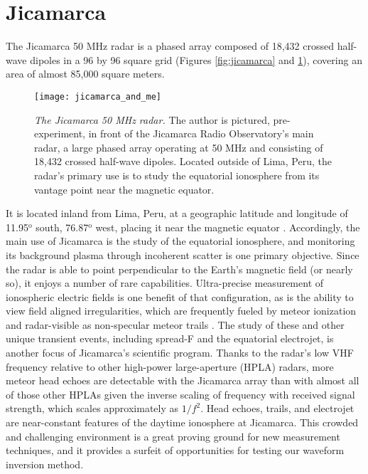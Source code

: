 \section{Jicamarca}
\label{jicamarca_overview}
The Jicamarca 50 MHz radar is a phased array composed of 18,432 crossed half-wave dipoles in a 96 by 96 square grid (Figures \ref{fig:jicamarca} and \ref{fig:jicamarca_and_me}), covering an area of almost 85,000 square meters.
\begin{figure}[tbp]
 \centering
 \texttt{[image: jicamarca\_and\_me]}
 \caption[The Jicamarca 50 MHz radar]{\emph{The Jicamarca 50 MHz radar.} The author is pictured, pre-experiment, in front of the Jicamarca Radio Observatory's main radar, a large phased array operating at 50 MHz and consisting of 18,432 crossed half-wave dipoles. Located outside of Lima, Peru, the radar's primary use is to study the equatorial ionosphere from its vantage point near the magnetic equator.}
 \label{fig:jicamarca_and_me}
\end{figure}%
It is located inland from Lima, Peru, at a geographic latitude and longitude of 11.95$^\text{o}$ south, 76.87$^\text{o}$ west, placing it near the magnetic equator \autocite{Och63}. Accordingly, the main use of Jicamarca is the study of the equatorial ionosphere, and monitoring its background plasma through incoherent scatter is one primary objective. Since the radar is able to point perpendicular to the Earth's magnetic field (or nearly so), it enjoys a number of rare capabilities. Ultra-precise measurement of ionospheric electric fields is one benefit of that configuration, as is the ability to view field aligned irregularities, which are frequently fueled by meteor ionization and radar-visible as non-specular meteor trails \autocite{WH69, CK94}. The study of these and other unique transient events, including spread-F and the equatorial electrojet, is another focus of Jicamarca's scientific program. Thanks to the radar's low VHF frequency relative to other high-power large-aperture (HPLA) radars, more meteor head echoes are detectable with the Jicamarca array than with almost all of those other HPLAs given the inverse scaling of frequency with received signal strength, which scales approximately as $1/f^2$. Head echoes, trails, and electrojet are near-constant features of the daytime ionosphere at Jicamarca. This crowded and challenging environment is a great proving ground for new measurement techniques, and it provides a surfeit of opportunities for testing our waveform inversion method.

